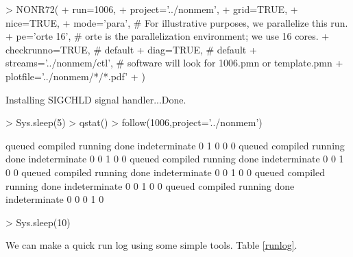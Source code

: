 \begin{Schunk}
\begin{Sinput}
> NONR72(
+      run=1006,
+      project='../nonmem',
+      grid=TRUE,
+      nice=TRUE,
+      mode='para',                         # For illustrative purposes, we parallelize this run.
+      pe='orte 16',                        # orte is the parallelization environment; we use 16 cores.
+      checkrunno=TRUE,                     # default
+      diag=TRUE,                           # default
+      streams='../nonmem/ctl',             # software will look for 1006.pmn or template.pmn
+      plotfile='../nonmem/*/*.pdf'
+ )
\end{Sinput}
\begin{Soutput}
Installing SIGCHLD signal handler...Done.
\end{Soutput}
\begin{Sinput}
> Sys.sleep(5)
> qstat()
> follow(1006,project='../nonmem')
\end{Sinput}
\begin{Soutput}
       queued      compiled       running          done indeterminate 
            0             1             0             0             0 
       queued      compiled       running          done indeterminate 
            0             0             1             0             0 
       queued      compiled       running          done indeterminate 
            0             0             1             0             0 
       queued      compiled       running          done indeterminate 
            0             0             1             0             0 
       queued      compiled       running          done indeterminate 
            0             0             1             0             0 
       queued      compiled       running          done indeterminate 
            0             0             0             1             0 
\end{Soutput}
\begin{Sinput}
> Sys.sleep(10)
\end{Sinput}
\end{Schunk}
We can make a quick run log using some simple tools. Table \ref{runlog}.
